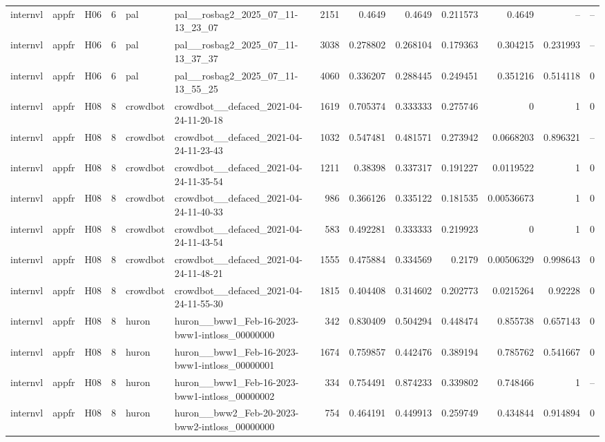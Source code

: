 \begin{longtable}{lllrllrrrrrrr}
internvl & appfr & H06 & 6 & pal & pal\_\_rosbag2\_2025\_07\_11-13\_23\_07 & 2151 & 0.4649 & 0.4649 & 0.211573 & 0.4649 & -- & -- \\
internvl & appfr & H06 & 6 & pal & pal\_\_rosbag2\_2025\_07\_11-13\_37\_37 & 3038 & 0.278802 & 0.268104 & 0.179363 & 0.304215 & 0.231993 & -- \\
internvl & appfr & H06 & 6 & pal & pal\_\_rosbag2\_2025\_07\_11-13\_55\_25 & 4060 & 0.336207 & 0.288445 & 0.249451 & 0.351216 & 0.514118 & 0 \\
internvl & appfr & H08 & 8 & crowdbot & crowdbot\_\_defaced\_2021-04-24-11-20-18 & 1619 & 0.705374 & 0.333333 & 0.275746 & 0 & 1 & 0 \\
internvl & appfr & H08 & 8 & crowdbot & crowdbot\_\_defaced\_2021-04-24-11-23-43 & 1032 & 0.547481 & 0.481571 & 0.273942 & 0.0668203 & 0.896321 & -- \\
internvl & appfr & H08 & 8 & crowdbot & crowdbot\_\_defaced\_2021-04-24-11-35-54 & 1211 & 0.38398 & 0.337317 & 0.191227 & 0.0119522 & 1 & 0 \\
internvl & appfr & H08 & 8 & crowdbot & crowdbot\_\_defaced\_2021-04-24-11-40-33 & 986 & 0.366126 & 0.335122 & 0.181535 & 0.00536673 & 1 & 0 \\
internvl & appfr & H08 & 8 & crowdbot & crowdbot\_\_defaced\_2021-04-24-11-43-54 & 583 & 0.492281 & 0.333333 & 0.219923 & 0 & 1 & 0 \\
internvl & appfr & H08 & 8 & crowdbot & crowdbot\_\_defaced\_2021-04-24-11-48-21 & 1555 & 0.475884 & 0.334569 & 0.2179 & 0.00506329 & 0.998643 & 0 \\
internvl & appfr & H08 & 8 & crowdbot & crowdbot\_\_defaced\_2021-04-24-11-55-30 & 1815 & 0.404408 & 0.314602 & 0.202773 & 0.0215264 & 0.92228 & 0 \\
internvl & appfr & H08 & 8 & huron & huron\_\_bww1\_Feb-16-2023-bww1-intloss\_00000000 & 342 & 0.830409 & 0.504294 & 0.448474 & 0.855738 & 0.657143 & 0 \\
internvl & appfr & H08 & 8 & huron & huron\_\_bww1\_Feb-16-2023-bww1-intloss\_00000001 & 1674 & 0.759857 & 0.442476 & 0.389194 & 0.785762 & 0.541667 & 0 \\
internvl & appfr & H08 & 8 & huron & huron\_\_bww1\_Feb-16-2023-bww1-intloss\_00000002 & 334 & 0.754491 & 0.874233 & 0.339802 & 0.748466 & 1 & -- \\
internvl & appfr & H08 & 8 & huron & huron\_\_bww2\_Feb-20-2023-bww2-intloss\_00000000 & 754 & 0.464191 & 0.449913 & 0.259749 & 0.434844 & 0.914894 & 0 \\

\end{longtable}
